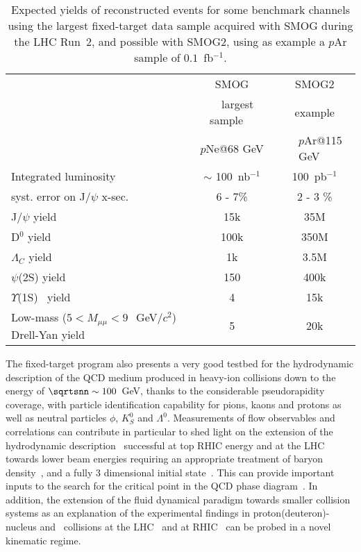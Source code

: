 \documentclass[../report.tex]{subfiles}
\begin{document}
\begin{table}[tb]
\caption{Expected yields of reconstructed events for some benchmark channels
using the largest fixed-target data sample acquired with SMOG during
the LHC Run~2, and possible with SMOG2, using as example a $p$Ar sample of $0.1$~fb$^{-1}$.
}
\label{tab:ftyields}
  \centering
  \begin{tabular}{lcc}
                               & SMOG                   &   SMOG2     \\
                               &  ~~largest sample~~    &    example  \\
                               &  $p$Ne@68 GeV            &  ~~$p$Ar@115 GeV~~   \\ \hline
Integrated luminosity          & $\sim$ 100~nb$^{-1}$     &    100~pb$^{-1}$  \\
syst. error on J/$\psi$ x-sec.    &     6 - 7\%            &    2 - 3  \%     \\
J/$\psi$ yield                    &      15k               &      35M          \\
D$^0$ yield                      &      100k              &      350M         \\
$\Lambda_C$ yield                      &       1k               &      3.5M         \\
$\psi$(2S) yield                 &       150              &      400k         \\
$\Upsilon$(1S)~ yield                   &       4               &       15k         \\
Low-mass ($5<M_{\mu\mu}<9~$~GeV/$c^2$) Drell-Yan yield
                               &       5               &       20k         \\
  \end{tabular}
\end{table}



The fixed-target program also presents a very good testbed for the
hydrodynamic description of the QCD medium produced in heavy-ion collisions
down to the energy of $\sqrtsnn \sim 100$~GeV, thanks to the
considerable pseudorapidity coverage, with particle identification capability for pions,
kaons and protons as well as neutral particles $\phi$, $K^0_S$ and $\Lambda^0$.
Measurements of flow observables and correlations can contribute in particular to shed light on the
extension of the hydrodynamic description~\cite{Song:2007ux,Schenke:2010rr} 
successful at top RHIC energy and at the LHC towards lower beam
energies requiring an appropriate 
treatment of baryon density~\cite{Karpenko:2015xea}, and a fully 3 dimensional initial state~\cite{Shen:2017bsr}.
This can provide important inputs to the search for the critical point in
the QCD phase diagram~\cite{Stephanov:2004wx,Luo:2017faz}. 
In addition, the extension of the fluid dynamical paradigm towards smaller collision systems as an
explanation of the experimental findings in proton(deuteron)-nucleus and \pp~collisions
at the LHC~\cite{Khachatryan:2010gv,CMS:2012qk,Abelev:2012ola,Aad:2012gla,Aaij:2015qcq} and
at RHIC~\cite{Adare:2018toe} can be probed in a novel kinematic regime.
\end{document}
